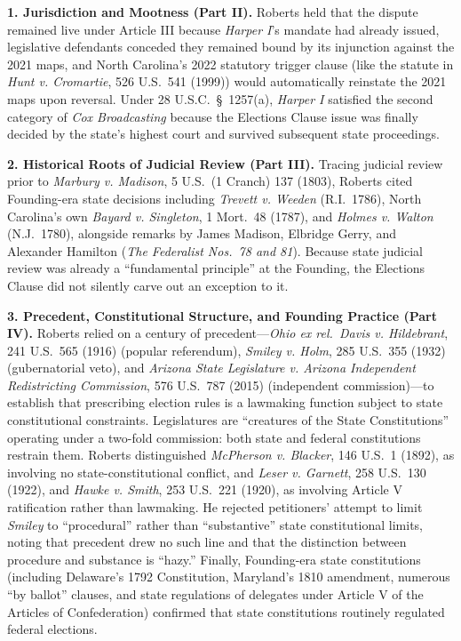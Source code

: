\documentclass[12pt]{article}
\begin{document}
\textbf{1. Jurisdiction and Mootness (Part II).} Roberts held that the dispute remained live under Article III because \textit{Harper I}'s mandate had already issued, legislative defendants conceded they remained bound by its injunction against the 2021 maps, and North Carolina's 2022 statutory trigger clause (like the statute in \textit{Hunt v. Cromartie}, 526 U.S.\ 541 (1999)) would automatically reinstate the 2021 maps upon reversal. Under 28 U.S.C.\ \S~1257(a), \textit{Harper I} satisfied the second category of \textit{Cox Broadcasting} because the Elections Clause issue was finally decided by the state's highest court and survived subsequent state proceedings.

\textbf{2. Historical Roots of Judicial Review (Part III).} Tracing judicial review prior to \textit{Marbury v. Madison}, 5 U.S.\ (1 Cranch) 137 (1803), Roberts cited Founding-era state decisions including \textit{Trevett v. Weeden} (R.I.\ 1786), North Carolina's own \textit{Bayard v. Singleton}, 1 Mort.\ 48 (1787), and \textit{Holmes v. Walton} (N.J.\ 1780), alongside remarks by James Madison, Elbridge Gerry, and Alexander Hamilton (\textit{The Federalist Nos.\ 78 and 81}). Because state judicial review was already a ``fundamental principle'' at the Founding, the Elections Clause did not silently carve out an exception to it.

\textbf{3. Precedent, Constitutional Structure, and Founding Practice (Part IV).} Roberts relied on a century of precedent---\textit{Ohio ex rel.\ Davis v. Hildebrant}, 241 U.S.\ 565 (1916) (popular referendum), \textit{Smiley v. Holm}, 285 U.S.\ 355 (1932) (gubernatorial veto), and \textit{Arizona State Legislature v. Arizona Independent Redistricting Commission}, 576 U.S.\ 787 (2015) (independent commission)---to establish that prescribing election rules is a lawmaking function subject to state constitutional constraints. Legislatures are ``creatures of the State Constitutions'' operating under a two-fold commission: both state and federal constitutions restrain them. Roberts distinguished \textit{McPherson v. Blacker}, 146 U.S.\ 1 (1892), as involving no state-constitutional conflict, and \textit{Leser v. Garnett}, 258 U.S.\ 130 (1922), and \textit{Hawke v. Smith}, 253 U.S.\ 221 (1920), as involving Article V ratification rather than lawmaking. He rejected petitioners' attempt to limit \textit{Smiley} to ``procedural'' rather than ``substantive'' state constitutional limits, noting that precedent drew no such line and that the distinction between procedure and substance is ``hazy.'' Finally, Founding-era state constitutions (including Delaware's 1792 Constitution, Maryland's 1810 amendment, numerous ``by ballot'' clauses, and state regulations of delegates under Article V of the Articles of Confederation) confirmed that state constitutions routinely regulated federal elections.
\end{document}
